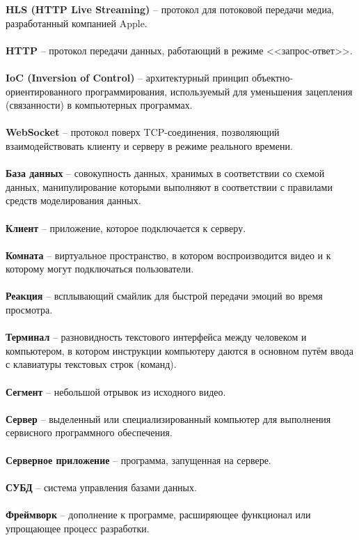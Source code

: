 \documentclass{../includes/TechDoc}
\begin{document}
    \noindent
    \textbf{HLS (HTTP Live Streaming)} -- протокол для потоковой передачи медиа, разработанный компанией Apple.\\\\
    \textbf{HTTP} -- протокол передачи данных, работающий в режиме <<запрос-ответ>>.\\\\
    \textbf{IoC (Inversion of Control)} -- архитектурный принцип объектно-ориентированного программирования, используемый для уменьшения зацепления (связанности) в компьютерных программах.\\\\
    \textbf{WebSocket} -- протокол поверх TCP-соединения, позволяющий взаимодействовать клиенту и серверу в режиме реального времени.\\\\
    \textbf{База данных} -- совокупность данных, хранимых в соответствии со схемой данных, манипулирование которыми выполняют в соответствии с правилами средств моделирования данных.\\\\
    \textbf{Клиент} -- приложение, которое подключается к серверу.\\\\
    \textbf{Комната} -- виртуальное пространство, в котором воспроизводится видео и к которому могут подключаться пользователи.\\\\
    \textbf{Реакция} -- всплывающий смайлик для быстрой передачи эмоций во время просмотра.\\\\
    \textbf{Терминал} -- разновидность текстового интерфейса между человеком и компьютером, в котором инструкции компьютеру даются в основном путём ввода с клавиатуры текстовых строк (команд).\\\\
    \textbf{Сегмент} -- небольшой отрывок из исходного видео.\\\\
    \textbf{Сервер} -- выделенный или специализированный компьютер для выполнения сервисного программного обеспечения.\\\\
    \textbf{Серверное приложение} -- программа, запущенная на сервере.\\\\
    \textbf{СУБД} -- система управления базами данных.\\\\
    \textbf{Фреймворк} -- дополнение к программе, расширяющее функционал или упрощающее процесс разработки.\\\\
\end{document}
